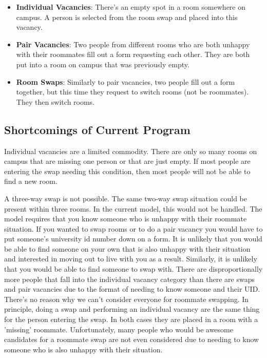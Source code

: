 \documentclass[12pt]{article}
\begin{document}

\begin{itemize}[noitemsep]
\item \textbf{Individual Vacancies}: There's an empty spot in a room somewhere on campus. A person is selected from the room swap and placed into this vacancy.\\
\item \textbf{Pair Vacancies}: Two people from different rooms who are both unhappy with their roommates fill out a form requesting each other. They are both put into a room on campus that was previously empty.\\
\item \textbf{Room Swaps}: Similarly to pair vacancies, two people fill out a form together, but this time they request to switch rooms (not be roommates). They then switch rooms.
\end{itemize}

\subsection{Shortcomings of Current Program}
Individual vacancies are a limited commodity. There are only so many rooms on campus that are missing one person or that are just empty. If most people are entering the swap needing this condition, then most people will not be able to find a new room. 

A three-way swap is not possible. The same two-way swap situation could be present within three rooms. In the current model, this would not be handled.
The model requires that you know someone who is unhappy with their roommate situation. If you wanted to swap rooms or to do a pair vacancy you would have to put someone’s university id number down on a form. It is unlikely that you would be able to find someone on your own that is also unhappy with their situation and interested in moving out to live with you as a result. Similarly, it is unlikely that you would be able to find someone to swap with. There are disproportionally more people that fall into the individual vacancy category than there are swaps and pair vacancies due to the format of needing to know someone and their UID. \\

There's no reason why we can't consider everyone for roommate swapping. In principle, doing a swap and performing an individual vacancy are the same thing for the person entering the swap. In both cases they are placed in a room with a 'missing' roommate. Unfortunately, many people who would be awesome candidates for a roommate swap are not even considered due to needing to know someone who is also unhappy with their situation.
\end{document}
